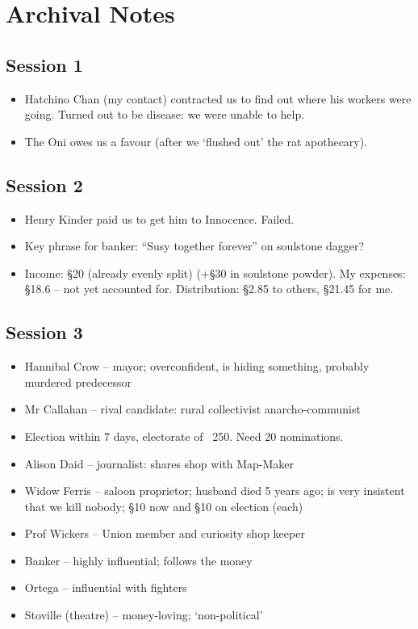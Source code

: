 \documentclass[10pt,a4paper]{article}
\begin{document}
\begin{minipage}[t]{\textwidth}

\section*{Archival Notes}

\subsection*{Session 1}

	\begin{itemize}
	  \item Hatchino Chan (my contact) contracted us to find out where his workers were going. Turned out to be disease: we were unable to help.
	  \item The Oni owes us a favour (after we `flushed out' the rat apothecary).
	\end{itemize}
	
\subsection*{Session 2} 

  \begin{itemize}
    \item Henry Kinder paid us to get him to Innocence. Failed.
    \item Key phrase for banker: ``Susy together forever'' on soulstone dagger?
    \item Income: §20 (already evenly split) (+§30 in soulstone powder). My expenses: §18.6 -- not yet accounted for. Distribution: §2.85 to others, §21.45 for me.
  \end{itemize}
  
\subsection*{Session 3}

  \begin{itemize}
    \item Hannibal Crow -- mayor; overconfident, is hiding something, probably murdered predecessor
    \item Mr Callahan -- rival candidate: rural collectivist anarcho-communist
    \item Election within 7 days, electorate of ~250. Need 20 nominations.
    \item Alison Daid -- journalist: shares shop with Map-Maker
    \item Widow Ferris -- saloon proprietor; husband died 5 years ago; is very insistent that we kill nobody; §10 now and §10 on election (each)
    \item Prof Wickers -- Union member and curiosity shop keeper
    \item Banker -- highly influential; follows the money
    \item Ortega -- influential with fighters
    \item Stoville (theatre) -- money-loving; `non-political'
  \end{itemize}

\end{minipage}
\end{document}
